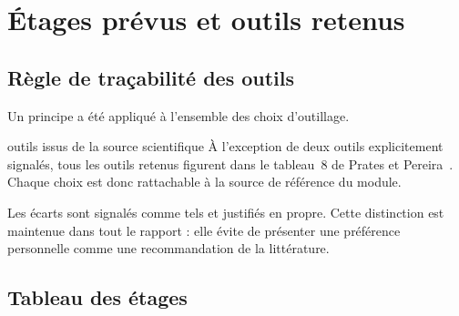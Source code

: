
\section{Étages prévus et outils retenus}

\subsection{Règle de traçabilité des outils}

Un principe a été appliqué à l'ensemble des choix d'outillage.

\begin{decision}{outils issus de la source scientifique}
À l'exception de deux outils explicitement signalés, tous les outils retenus
figurent dans le tableau~8 de Prates et Pereira~\cite{prates2025}. Chaque choix
est donc rattachable à la source de référence du module.

Les écarts sont signalés comme tels et justifiés en propre. Cette distinction
est maintenue dans tout le rapport : elle évite de présenter une préférence
personnelle comme une recommandation de la littérature.
\end{decision}

\subsection{Tableau des étages}

